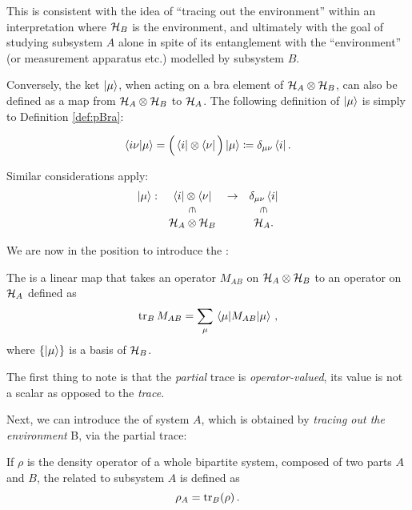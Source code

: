 This is consistent with the idea of
``tracing out the environment'' within an interpretation where
$\mathcal{H}_B$ is the environment, and ultimately with the goal of
studying subsystem $A$ alone in spite of its entanglement with the 
``environment'' (or measurement apparatus etc.) modelled by
subsystem $B$.

Conversely,
the ket $\ket{\mu}$, when acting on a bra element of $\mathcal{H}_{A} \otimes \mathcal{H}_{B}$,
can also be defined
as a map from $\mathcal{H}_A\otimes\mathcal{H}_B$ to $\mathcal{H}_A$.
The following definition of $\ket{\mu}$ is simply  to Definition \ref{def:pBra}:
\begin{definition}\label{def:pKet}
  \[
    \braket{i\nu}{\mu} = \Big(\bra{i}\otimes\bra{\nu}\Big)\ket{\mu} \coloneqq \delta_{\mu\nu}\bra{i} \text{.}
  \]
\end{definition}
Similar considerations apply:
\[
  \begin{array}{cccc}
    \ket{\mu}:  & \bra{i}\ox\bra{\nu}                   & \rightarrow & \delta_{\mu\nu}\bra{i}               \\
                & \rotatebox[origin=c]{270}{$\in$}      &             & \rotatebox[origin=c]{270}{$\in$}      \\
                & \hilb{H}_A\ox\hilb{H}_B               &             & \hilb{H}_A     \text{.}
  \end{array}
\]


We are now in the position to introduce the :
\begin{definition}\label{def:pTr}
  The 
  is a linear map
  that takes an operator
  $M_{AB}$ on $\mathcal{H}_A \otimes \mathcal{H}_B$
  to an operator on $\mathcal{H}_A$ defined as
  \[
    \tr_B M_{AB} = \sum_{\mu} \matrixel{\mu}{M_{AB}}{\mu}
    \, \text{,}
  \]
  where $\left\{\ket{\mu}\right\}$ is a basis of $\mathcal{H}_B$.
\end{definition}

The first thing to note is that the \emph{partial} trace is \emph{operator-valued},
its value is not a scalar as opposed to the \emph{trace}.

Next, we can introduce the 
of system $A$, which is obtained by \emph{tracing out the environment} B,
via the partial trace:
\begin{definition}\label{def:density_A}
  If $\rho$ is the density operator of a whole bipartite system, composed of two parts $A$ and $B$,
  the  related to subsystem $A$ is defined as
  \[
    \rho_A = \tr_B(\rho) \, \text{.}
  \]
\end{definition}

